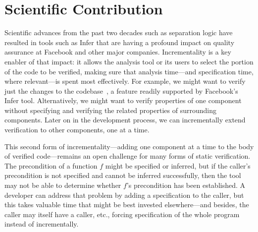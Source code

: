 \documentclass[10pt,twocolumn]{article}
\begin{document}
\begin{sloppypar}

\twocolumn[
\begin{center}
\Large
\textbf{Incremental Verification, Gradually}

\vspace{0.5cm}

\normalsize
\textbf{Jonathan Aldrich
(\href{https://dblp.uni-trier.de/pers/hd/a/Aldrich:Jonathan}{DBLP}
/\href{https://scholar.google.com/citations?user=AzHmOtcAAAAJ&hl=en}{GS}),
%
\'Eric Tanter (\href{https://dblp.uni-trier.de/pers/hd/t/Tanter:=Eacute=ric}{DBLP}/\href{https://scholar.google.com/citations?user=d0LISE4AAAAJ}{GS}), 
%
and Joshua Sunshine 
(\href{https://dblp.uni-trier.de/pers/hd/s/Sunshine:Joshua}{DBLP}
/\href{https://scholar.google.com/citations?user=V1texCUAAAAJ&hl=en&oi=ao}{GS})
}

\vspace{0.5cm}

\end{center}]

\section{Scientific Contribution}
\vspace{-2ex}

Scientific advances from the past two decades such as separation logic have resulted in tools such as Infer that are having a profound impact on quality assurance at Facebook and other major companies.  Incrementality is a key enabler of that impact: it allows the analysis tool or its users to select the portion of the code to be verified, making sure that analysis time---and specification time, where relevant---is spent most effectively.  For example, we might want to verify just the changes to the codebase~\cite{StartupsScaleups}, a feature readily supported by Facebook's Infer tool.  Alternatively, we might want to verify properties of one component without specifying and verifying the related properties of surrounding components.  Later on in the development process, we can incrementally extend verification to other components, one at a time.

This second form of incrementality---adding one component at a time to the body of verified code---remains an open challenge for many forms of static verification. The precondition of a function $f$ might be specified or inferred, but if the caller's precondition is not specified and cannot be inferred successfully, then the tool may not be able to determine whether $f$'s precondition has been established. A developer can address that problem by adding a specification to the caller, but this takes valuable time that
might be best invested elsewhere---and besides, the caller may itself have a caller, etc., forcing specification of the whole program instead of incrementally.


\end{sloppypar}
\end{document}
